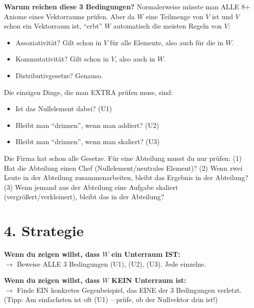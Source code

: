 \documentclass[a4paper,12pt]{article}
\begin{document}
\textbf{Warum reichen diese 3 Bedingungen?} Normalerweise m\"usste man ALLE 8+ Axiome eines Vektorraums pr\"ufen. Aber da $W$ eine Teilmenge von $V$ ist und $V$ schon ein Vektorraum ist, ``erbt'' $W$ automatisch die meisten Regeln von $V$:
\begin{itemize}
    \item Assoziativit\"at? Gilt schon in $V$ f\"ur alle Elemente, also auch f\"ur die in $W$.
    \item Kommutativit\"at? Gilt schon in $V$, also auch in $W$.
    \item Distributivgesetze? Genauso.
\end{itemize}

Die einzigen Dinge, die man EXTRA pr\"ufen muss, sind:
\begin{itemize}
    \item Ist das Nullelement dabei? (U1)
    \item Bleibt man ``drinnen'', wenn man addiert? (U2)
    \item Bleibt man ``drinnen'', wenn man skaliert? (U3)
\end{itemize}

\begin{analogie}
Die Firma hat schon alle Gesetze. F\"ur eine Abteilung musst du nur pr\"ufen: (1) Hat die Abteilung einen Chef (Nullelement/neutrales Element)? (2) Wenn zwei Leute in der Abteilung zusammenarbeiten, bleibt das Ergebnis in der Abteilung? (3) Wenn jemand aus der Abteilung eine Aufgabe skaliert (vergr\"o\ss ert/verkleinert), bleibt das in der Abteilung?
\end{analogie}

\section*{4. Strategie}

\begin{merkbox}[title={Strategie-\"Ubersicht}]
\textbf{Wenn du zeigen willst, dass $W$ ein Unterraum IST:}\\
$\rightarrow$ Beweise ALLE 3 Bedingungen (U1), (U2), (U3). Jede einzelne.

\medskip
\textbf{Wenn du zeigen willst, dass $W$ KEIN Unterraum ist:}\\
$\rightarrow$ Finde EIN konkretes Gegenbeispiel, das EINE der 3 Bedingungen verletzt.\\
(Tipp: Am einfachsten ist oft (U1) -- pr\"ufe, ob der Nullvektor drin ist!)
\end{merkbox}
\end{document}
